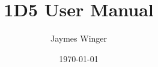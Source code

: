 \documentclass[12pt,twoside,letterpaper,openany,draft]{book}
\begin{document}
\title{1D5 User Manual}
\author{Jaymes Winger}
\date{\today}
\frontmatter
\maketitle

\tableofcontents



\mainmatter




\appendix


\backmatter


\printindex

\end{document}
